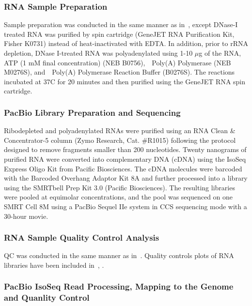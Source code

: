 \subsubsection{RNA Sample Preparation}

Sample preparation was conducted in the same manner as in~, except DNase-I treated RNA was purified by spin cartridge (GeneJET RNA Purification Kit, Fisher K0731) instead of heat-inactivated with EDTA. In addition, prior to rRNA depletion, DNase I-treated RNA was polyadenylated using 1-10 $\mu$g of the RNA, ATP (1 mM final concentration) (NEB B0756),~\eco~Poly(A) Polymerase (NEB M0276S), and~\eco~Poly(A) Polymerase Reaction Buffer (B0276S). The reactions incubated at 37\textdegree C for 20 minutes and then purified using the GeneJET RNA spin cartridge. 

\subsubsection{PacBio Library Preparation and Sequencing}

Ribodepleted and polyadenylated RNAs were purified using an RNA Clean \& Concentrator-5 column (Zymo Research, Cat. \#R1015) following the protocol designed to remove fragments smaller than 200 nucleotides. Twenty nanograms of purified RNA were converted into complementary DNA (cDNA) using the IsoSeq Express Oligo Kit from Pacific Biosciences. The cDNA molecules were barcoded with the Barcoded Overhang Adaptor Kit 8A and further processed into a library using the SMRTbell Prep Kit 3.0 (Pacific Biosciences). The resulting libraries were pooled at equimolar concentrations, and the pool was sequenced on one SMRT Cell 8M using a PacBio Sequel IIe system in CCS sequencing mode with a 30-hour movie.

\subsubsection{RNA Sample Quality Control Analysis}\label{sec:methods-pacbio-qc}
QC was conducted in the same manner as in~. Quality controls plots of RNA libraries have been included in~, .%

\subsubsection{PacBio IsoSeq Read Processing, Mapping to the Genome and Quanlity Control}

